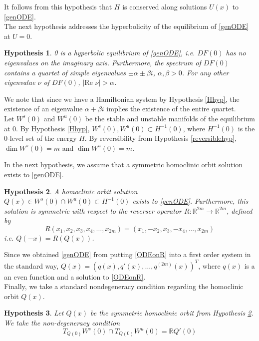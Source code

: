 \documentclass[12pt]{article}
\def\R{{\mathbb R}}
\newtheorem{hypothesis}{Hypothesis}
\begin{document}
It follows from this hypothesis that $H$ is conserved along solutions $U(x)$ to \eqref{genODE}.\\

The next hypothesis addresses the hyperbolicity of the equilibrium of \eqref{genODE} at $U = 0$.  

\begin{hypothesis}\label{hypeq}
0 is a hyperbolic equilibrium of \eqref{genODE}, i.e. $DF(0)$ has no eigenvalues on the imaginary axis. Furthermore, the spectrum of $DF(0)$ contains a quartet of simple eigenvalues $\pm \alpha \pm \beta i$, $\alpha, \beta > 0$. For any other eigenvalue $\nu$ of $DF(0)$, $|\text{Re }\nu| > \alpha$.
\end{hypothesis}

We note that since we have a Hamiltonian system by Hypothesis \ref{Hhyp}, the existence of an eigenvalue $\alpha + \beta i$ implies the existence of the entire quartet.\\

Let $W^s(0)$ and $W^u(0)$ be the stable and unstable manifolds of the equilibrium at 0. By Hypothesis \ref{Hhyp}, $W^s(0), W^u(0) \subset H^{-1}(0)$, where $H^{-1}(0)$ is the 0-level set of the energy $H$. By reversibility from Hypothesis \ref{reversiblehyp}, $\dim W^s(0) = m$ and $\dim W^u(0) = m$.

In the next hypothesis, we assume that a symmetric homoclinic orbit solution exists to \eqref{genODE}.

\begin{hypothesis}\label{qexistshyp}
A homoclinic orbit solution $Q(x) \in W^s(0) \cap W^u(0) \subset H^{-1}(0)$ exists to \eqref{genODE}. Furthermore, this solution is symmetric with respect to the reverser operator $R:\R^{2m} \rightarrow \R^{2m}$, defined by
\begin{equation}\label{reverserR2m}
R(x_1, x_2, x_3, x_4, \dots, x_{2m}) = (x_1, -x_2, x_3, -x_4, \dots, x_{2m})
\end{equation}
i.e. $Q(-x) = R(Q(x))$.
\end{hypothesis}
 
Since we obtained \eqref{genODE} from putting \eqref{ODEonR} into a first order system in the standard way, $Q(x) = (q(x), q'(x), \dots, q^{(2m)}(x))^T$, where $q(x)$ is a an even function and a solution to \eqref{ODEonR}.\\

Finally, we take a standard nondegeneracy condition regarding the homoclinic orbit $Q(x)$.

\begin{hypothesis}\label{nondegen1}
Let $Q(x)$ be the symmetric homoclinic orbit from Hypothesis \ref{qexistshyp}. We take the non-degeneracy condition
\begin{equation}
T_{Q(0)}W^s(0) \cap T_{Q(0)}W^u(0) = \R Q'(0)
\end{equation}
\end{hypothesis}
\end{document}
